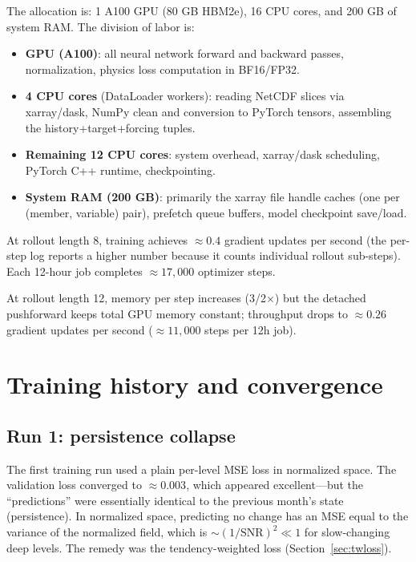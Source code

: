 \documentclass[11pt]{article}
\begin{document}
The allocation is: 1 A100 GPU (80 GB HBM2e), 16 CPU cores, and 200 GB of
system RAM. The division of labor is:
\begin{itemize}[itemsep=2pt]
  \item \textbf{GPU (A100)}: all neural network forward and backward passes,
        normalization, physics loss computation in BF16/FP32.
  \item \textbf{4 CPU cores} (DataLoader workers): reading NetCDF slices via
        xarray/dask, NumPy clean and conversion to PyTorch tensors,
        assembling the history+target+forcing tuples.
  \item \textbf{Remaining 12 CPU cores}: system overhead, xarray/dask
        scheduling, PyTorch C++ runtime, checkpointing.
  \item \textbf{System RAM (200 GB)}: primarily the xarray file handle
        caches (one per (member, variable) pair), prefetch queue buffers,
        model checkpoint save/load.
\end{itemize}
At rollout length 8, training achieves $\approx0.4$ gradient
updates per second (the per-step log reports a higher number because it
counts individual rollout sub-steps). Each 12-hour job completes
$\approx17{,}000$ optimizer steps.

At rollout length 12, memory per step increases (3/2$\times$) but the detached
pushforward keeps total GPU memory constant; throughput drops to
$\approx0.26$ gradient updates per second ($\approx11{,}000$ steps per 12h job).

\section{Training history and convergence}
\label{sec:runhistory}

\subsection{Run 1: persistence collapse}
The first training run used a plain per-level MSE loss in normalized space.
The validation loss converged to $\approx0.003$, which appeared excellent---but
the ``predictions'' were essentially identical to the previous month's state
(persistence). In normalized space, predicting no change has an MSE equal to
the variance of the normalized field, which is $\sim(1/\text{SNR})^2 \ll 1$
for slow-changing deep levels. The remedy was the tendency-weighted loss
(Section~\ref{sec:twloss}).
\end{document}
